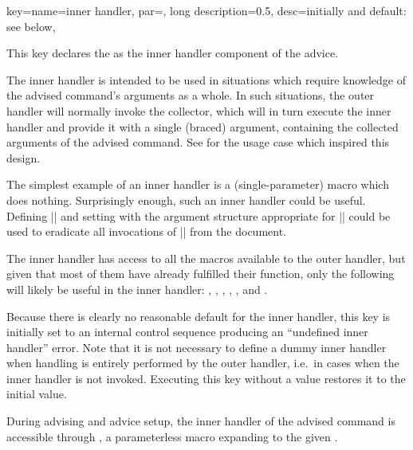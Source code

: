 \documentclass[a4paper,11pt]{article}
\begin{document}
\begin{doc}{
    key={name=inner handler, par=, long description=0.5,
      desc=initially and default: see below},
  }

  This key declares the  as the inner handler component
  of the advice.

  The inner handler is intended to be used in situations which require
  knowledge of the advised command's arguments as a whole.  In such situations,
  the outer handler will normally invoke the collector, which will in turn
  execute the inner handler and provide it with a single (braced) argument,
  containing the collected arguments of the advised command.  See
   for the usage case which inspired this design.

  The simplest example of an inner handler is a (single-parameter) macro which
  does nothing.  Surprisingly enough, such an inner handler could be useful.
  Defining |\def\Gobble#1{}| and setting
   with the argument structure
  appropriate for |\foo| could be used to eradicate all invocations of |\foo|
  from the document.

  The inner handler has access to all the macros available to the outer
  handler, but given that most of them have already fulfilled their function,
  only the following will likely be useful in the inner handler:
  , , ,
  , , and .

  Because there is clearly no reasonable default for the inner handler, this key
  is initially set to an internal control sequence producing an ``undefined
  inner handler'' error.  Note that it is not necessary to define a dummy inner
  handler when handling is entirely performed by the outer handler, i.e.\ in
  cases when the inner handler is not invoked.  Executing this key without a
  value restores it to the initial value.
  
  During advising and advice setup, the inner handler of the advised command is
  accessible through , a parameterless macro
  expanding to the given .
\end{doc}
\end{document}

